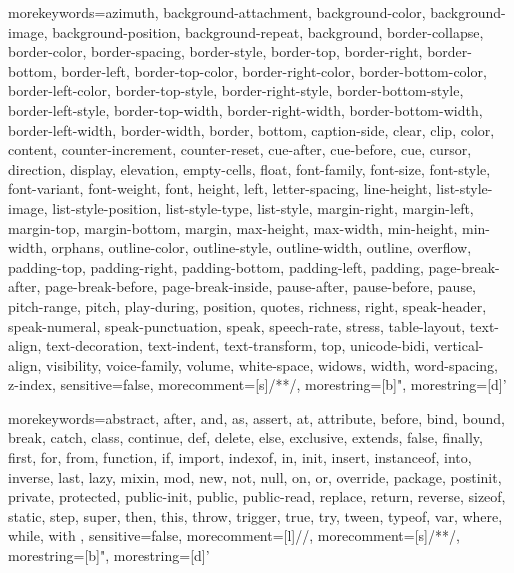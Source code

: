  {morekeywords={azimuth,  background-attachment,  background-color,  background-image,  background-position,  background-repeat,  background,  border-collapse,  border-color,  border-spacing,  border-style,  border-top, border-right, border-bottom, border-left,  border-top-color, border-right-color, border-bottom-color, border-left-color,  border-top-style, border-right-style, border-bottom-style, border-left-style,  border-top-width, border-right-width, border-bottom-width, border-left-width,  border-width,  border,  bottom,  caption-side,  clear,  clip,  color,  content,  counter-increment,  counter-reset,  cue-after,  cue-before,  cue,  cursor,  direction,  display,  elevation,  empty-cells,  float,  font-family,  font-size,  font-style,  font-variant,  font-weight,  font,  height,  left,  letter-spacing,  line-height,  list-style-image,  list-style-position,  list-style-type,  list-style,  margin-right, margin-left,  margin-top, margin-bottom,  margin,  max-height,  max-width,  min-height,  min-width,  orphans,  outline-color,  outline-style,  outline-width,  outline,  overflow,  padding-top, padding-right, padding-bottom, padding-left,  padding,  page-break-after,  page-break-before,  page-break-inside,  pause-after,  pause-before,  pause,  pitch-range,  pitch,  play-during,  position,  quotes,  richness,  right,  speak-header,  speak-numeral,  speak-punctuation,  speak,  speech-rate,  stress,  table-layout,  text-align,  text-decoration,  text-indent,  text-transform,  top,  unicode-bidi,  vertical-align,  visibility,  voice-family,  volume,  white-space,  widows,  width,  word-spacing,  z-index},
sensitive=false, morecomment=[s]{/*}{*/}, morestring=[b]", morestring=[d]'}

 {morekeywords={abstract, after, and, as, assert, at, attribute, before, bind, bound, break, catch, class, continue, def, delete, else, exclusive, extends, false, finally, first, for, from, function, if, import, indexof, in, init, insert, instanceof, into, inverse, last, lazy, mixin, mod, new, not, null, on, or, override, package, postinit, private, protected, public-init, public, public-read, replace, return, reverse, sizeof, static, step, super, then, this, throw, trigger, true, try, tween, typeof, var, where, while, with },
sensitive=false, morecomment=[l]{//}, morecomment=[s]{/*}{*/}, morestring=[b]", morestring=[d]'}

